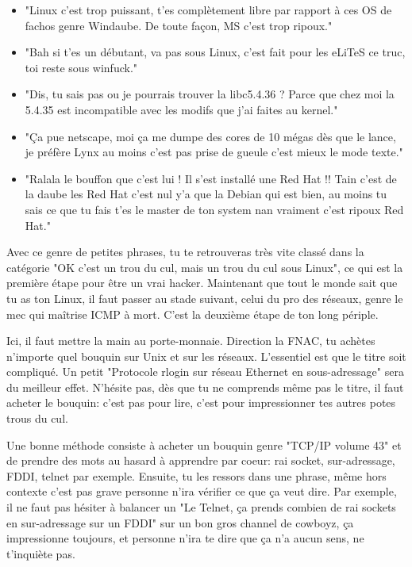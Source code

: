 	\begin{itemize}
		\item "Linux c'est trop puissant, t'es complètement libre par rapport à ces OS de fachos genre Windaube. De toute façon, MS c'est trop ripoux."
	
		\item "Bah si t'es un débutant, va pas sous Linux, c'est fait pour les eLiTeS ce truc, toi reste sous winfuck."
	
		\item "Dis, tu sais pas ou je pourrais trouver la libc5.4.36 ? Parce que chez moi la 5.4.35 est incompatible avec les modifs que j'ai faites au kernel."
	
		\item "Ça pue netscape, moi ça me dumpe des cores de 10 mégas dès que le lance, je préfère Lynx au moins c'est pas prise de gueule c'est mieux le mode texte."
	
		\item "Ralala le bouffon que c'est lui ! Il s'est installé une Red Hat !! Tain c'est de la daube les Red Hat c'est nul y'a que la Debian qui est bien, au moins tu sais ce que tu fais t'es le master de ton system nan vraiment c'est ripoux Red Hat."
	\end{itemize}
	
	Avec ce genre de petites phrases, tu te retrouveras très vite classé dans la catégorie "OK c'est un trou du cul, mais un trou du cul sous Linux", ce qui est la première étape pour être un vrai hacker. Maintenant que tout le monde sait que tu as ton Linux, il faut passer au stade suivant, celui du pro des réseaux, genre le mec qui maîtrise ICMP à mort. C'est la deuxième étape de ton long périple.
	
	Ici, il faut mettre la main au porte-monnaie. Direction la FNAC, tu achètes n'importe quel bouquin sur Unix et sur les réseaux. L'essentiel est que le titre soit compliqué. Un petit "Protocole rlogin sur réseau Ethernet en sous-adressage" sera du meilleur effet. N'hésite pas, dès que tu ne comprends même pas le titre, il faut acheter le bouquin: c'est pas pour lire, c'est pour impressionner tes autres potes trous du cul.
	
	Une bonne méthode consiste à acheter un bouquin genre "TCP/IP volume 43" et de prendre des mots au hasard à apprendre par coeur: rai socket, sur-adressage, FDDI, telnet par exemple. Ensuite, tu les ressors dans une phrase, même hors contexte c'est pas grave personne n'ira vérifier ce que ça veut dire. Par exemple, il ne faut pas hésiter à balancer un "Le Telnet, ça prends combien de rai sockets en sur-adressage sur un FDDI" sur un bon gros channel de cowboyz, ça impressionne toujours, et personne n'ira te dire que ça n'a aucun sens, ne t'inquiète pas.
	
